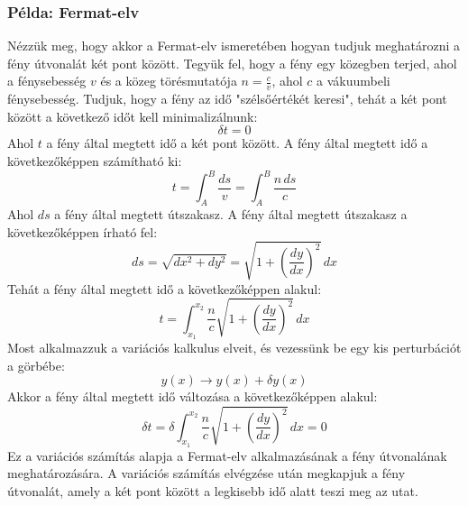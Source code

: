 \documentclass[../main.tex]{subfiles}
\begin{document}
\subsubsection*{Példa: Fermat-elv}
Nézzük meg, hogy akkor a Fermat-elv ismeretében hogyan tudjuk meghatározni a fény útvonalát két pont között. Tegyük fel, hogy a fény egy közegben terjed, ahol a fénysebesség $v$ és a közeg törésmutatója $n = \frac{c}{v}$, ahol $c$ a vákuumbeli fénysebesség.
Tudjuk, hogy a fény az idő "szélsőértékét keresi", tehát a két pont között a következő időt kell minimalizálnunk:
\begin{equation}
    \delta t = 0
\end{equation}
Ahol $t$ a fény által megtett idő a két pont között. A fény által megtett idő a következőképpen számítható ki:
\begin{equation}
    t = \int_{A}^{B} \frac{ds}{v} = \int_{A}^{B} \frac{n \, ds}{c}
\end{equation}
Ahol $ds$ a fény által megtett útszakasz. A fény által megtett útszakasz a következőképpen írható fel:
\begin{equation}
    ds = \sqrt{dx^2 + dy^2} = \sqrt{1 + \left(\frac{dy}{dx}\right)^2} \, dx
\end{equation}
Tehát a fény által megtett idő a következőképpen alakul:
\begin{equation}
    t = \int_{x_1}^{x_2} \frac{n}{c} \sqrt{1 + \left(\frac{dy}{dx}\right)^2} \, dx
\end{equation}
Most alkalmazzuk a variációs kalkulus elveit, és vezessünk be egy kis perturbációt a görbébe:
\begin{equation}
    y(x) \to y(x) + \delta y(x)
\end{equation}
Akkor a fény által megtett idő változása a következőképpen alakul:
\begin{equation}
    \delta t = \delta \int_{x_1}^{x_2} \frac{n}{c} \sqrt{1 + \left(\frac{dy}{dx}\right)^2} \, dx = 0
\end{equation}
Ez a variációs számítás alapja a Fermat-elv alkalmazásának a fény útvonalának meghatározására. A variációs számítás elvégzése után megkapjuk a fény útvonalát, amely a két pont között a legkisebb idő alatt teszi meg az utat.
\end{document}
